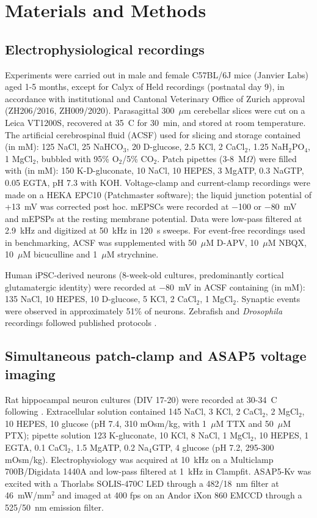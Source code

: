 \documentclass[11pt]{article}
\begin{document}
\section{Materials and Methods}

\subsection{Electrophysiological recordings}
Experiments were carried out in male and female C57BL/6J mice (Janvier Labs)
aged 1-5 months, except for Calyx of Held recordings (postnatal day 9), in
accordance with institutional and Cantonal Veterinary Office of Zurich
approval (ZH206/2016, ZH009/2020). Parasagittal 300~$\mu$m cerebellar slices
were cut on a Leica VT1200S, recovered at 35~\textdegree C for 30~min, and
stored at room temperature. The artificial cerebrospinal fluid (ACSF) used
for slicing and storage contained (in mM): 125 NaCl, 25 NaHCO$_3$, 20
D-glucose, 2.5 KCl, 2 CaCl$_2$, 1.25 NaH$_2$PO$_4$, 1 MgCl$_2$, bubbled
with 95\% O$_2$/5\% CO$_2$. Patch pipettes (3-8~M$\Omega$) were filled with
(in mM): 150 K-D-gluconate, 10 NaCl, 10 HEPES, 3 MgATP, 0.3 NaGTP, 0.05
EGTA, pH 7.3 with KOH. Voltage-clamp and current-clamp recordings were made
on a HEKA EPC10 (Patchmaster software); the liquid junction potential of
+13~mV was corrected post hoc. mEPSCs were recorded at $-$100 or $-$80~mV
and mEPSPs at the resting membrane potential. Data were low-pass filtered
at 2.9~kHz and digitized at 50~kHz in 120~s sweeps. For event-free
recordings used in benchmarking, ACSF was supplemented with 50~$\mu$M
D-APV, 10~$\mu$M NBQX, 10~$\mu$M bicuculline and 1~$\mu$M strychnine.

Human iPSC-derived neurons (8-week-old cultures, predominantly cortical
glutamatergic identity) were recorded at $-$80~mV in ACSF containing (in mM):
135 NaCl, 10 HEPES, 10 D-glucose, 5 KCl, 2 CaCl$_2$, 1 MgCl$_2$. Synaptic
events were observed in approximately 51\% of neurons. Zebrafish and
\textit{Drosophila} recordings followed published protocols
\citep{rupprecht2018zebrafish, baccinocalace2022thin}.

\subsection{Simultaneous patch-clamp and ASAP5 voltage imaging}
Rat hippocampal neuron cultures (DIV 17-20) were recorded at 30-34~\textdegree C
following \citep{hao2024asap5}. Extracellular solution contained 145 NaCl,
3 KCl, 2 CaCl$_2$, 2 MgCl$_2$, 10 HEPES, 10 glucose (pH 7.4, 310 mOsm/kg,
with 1~$\mu$M TTX and 50~$\mu$M PTX); pipette solution 123 K-gluconate,
10 KCl, 8 NaCl, 1 MgCl$_2$, 10 HEPES, 1 EGTA, 0.1 CaCl$_2$, 1.5 MgATP,
0.2 Na$_4$GTP, 4 glucose (pH 7.2, 295-300 mOsm/kg). Electrophysiology was
acquired at 10~kHz on a Multiclamp 700B/Digidata 1440A and low-pass filtered
at 1~kHz in Clampfit. ASAP5-Kv was excited with a Thorlabs SOLIS-470C LED
through a 482/18~nm filter at 46~mW/mm$^2$ and imaged at 400 fps on an
Andor iXon 860 EMCCD through a 525/50~nm emission filter.
\end{document}

